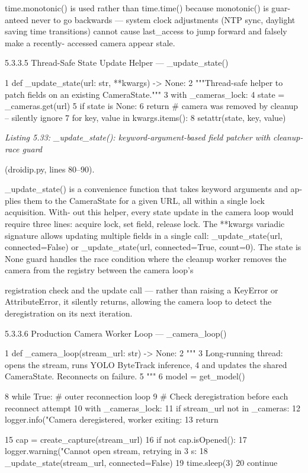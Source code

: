 time.monotonic() is used rather than time.time() because monotonic() is guar-
anteed never to go backwards --- system clock adjustments (NTP sync, daylight saving
time transitions) cannot cause last\_access to jump forward and falsely make a recently-
accessed camera appear stale.


5.3.3.5 Thread-Safe State Update Helper --- \_update\_state()

1 def \_update\_state(url: str, **kwargs) -> None:
2 """Thread-safe helper to patch fields on an existing CameraState."""
3 with \_cameras\_lock:
4 state = \_cameras.get(url)
5 if state is None:
6 return \# camera was removed by cleanup -- silently ignore
7 for key, value in kwargs.items():
8 setattr(state, key, value)


\textit{Listing 5.33: \_update\_state(): keyword-argument-based ﬁeld patcher with cleanup-race guard}

(droidip.py, lines 80--90).


\_update\_state() is a convenience function that takes keyword arguments and ap-
plies them to the CameraState for a given URL, all within a single lock acquisition. With-
out this helper, every state update in the camera loop would require three lines: acquire lock,
set ﬁeld, release lock. The **kwargs variadic signature allows updating multiple ﬁelds
in a single call: \_update\_state(url, connected=False) or \_update\_state(url,
connected=True, count=0). The state is None guard handles the race condition
where the cleanup worker removes the camera from the registry between the camera loop's



registration check and the update call --- rather than raising a KeyError or AttributeError,
it silently returns, allowing the camera loop to detect the deregistration on its next iteration.


5.3.3.6 Production Camera Worker Loop --- \_camera\_loop()

1 def \_camera\_loop(stream\_url: str) -> None:
2 """
3 Long-running thread: opens the stream, runs YOLO ByteTrack inference,
4 and updates the shared CameraState. Reconnects on failure.
5 """
6 model = get\_model()

8 while True: \# outer reconnection loop
9 \# Check deregistration before each reconnect attempt
10 with \_cameras\_lock:
11 if stream\_url not in \_cameras:
12 logger.info("Camera deregistered, worker exiting: %
13 return

15 cap = create\_capture(stream\_url)
16 if not cap.isOpened():
17 logger.warning("Cannot open stream, retrying in 3 s: %
18 \_update\_state(stream\_url, connected=False)
19 time.sleep(3)
20 continue

